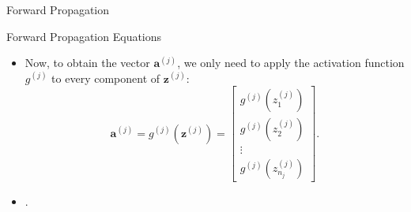 \documentclass[8pt,american]{beamer}
\begin{document}
\begin{frame}{Forward Propagation}

\begin{block}{Forward Propagation Equations}
\begin{itemize}
\justifying
\item Now, to obtain the vector $\mathbf{a}^{\left(j\right)}$, we only need to
  apply the activation function $g^{\left(j\right)}$ to every component of
  $\mathbf{z}^{\left(j\right)}$:
  \begin{equation}
  \mathbf{a}^{\left(j\right)}=g^{\left(j\right)}\left(\mathbf{z}^{\left(j\right)}\right)=\begin{bmatrix}g^{\left(j\right)}\left(z_{1}^{\left(j\right)}\right)\\
  g^{\left(j\right)}\left(z_{2}^{\left(j\right)}\right)\\
  \vdots\\
  g^{\left(j\right)}\left(z_{n_{j}}^{\left(j\right)}\right)
  \end{bmatrix}.
  \end{equation}
\item .
\end{itemize}
\end{block}

\end{frame}
\end{document}
